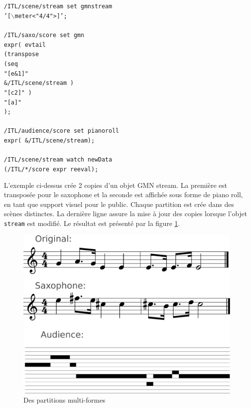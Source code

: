 \documentclass{article}
\newcommand{\OSC}[1]	{{\fontsize{10pt}{10pt} \selectfont\texttt{#1}}}
\newcommand{\tab}{\hspace*{4mm}}
\newcommand{\sample}	[1]			{\vspace{-0.2em}\begin{center}\colorbox{mygrey}{\begin{minipage}[t]{0.97\columnwidth} {\small \texttt{#1}}\end{minipage}}\end{center}}
\begin{document}
\sample{/ITL/scene/stream set gmnstream \\
\tab '[$\backslash$meter<"4/4">]';\\
\\
/ITL/saxo/score set gmn \\
\tab expr( evtail\\
\tab \tab (transpose\\
\tab \tab \tab (seq\\
\tab \tab \tab \tab "[e\&1]"\\
\tab \tab \tab \tab \&/ITL/scene/stream )\\
\tab \tab \tab "[c2]" )\\
\tab \tab "[a]"\\
\tab );\\
\\
/ITL/audience/score set pianoroll \\
\tab expr( \&/ITL/scene/stream);\\
\\
/ITL/scene/stream watch newData\\
\tab(/ITL/*/score expr reeval);
}
L'exemple ci-dessus crée 2 copies d'un objet GMN stream. La première est transposée pour le saxophone et la seconde est affichée sous forme de piano roll, en tant que support visuel pour le public. Chaque partition est crée dans des scènes distinctes. La dernière ligne assure la mise à jour des copies lorsque l'objet \OSC{stream} est modifié. Le résultat est présenté par la figure \ref{fig:mutliscoreFig}.

\begin{figure}[th]
\centering
\includegraphics[width=0.95\columnwidth]{imgs/example1}
\caption{Des partitions multi-formes
\label{fig:mutliscoreFig}}
\end{figure}
\end{document}
